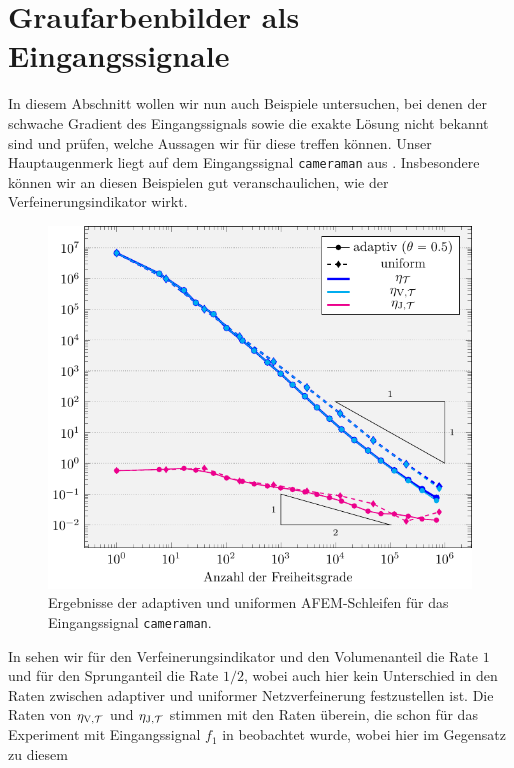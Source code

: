\section{Graufarbenbilder als Eingangssignale}
\label{sec:grayscalePicturesAsInputSignal}

In diesem Abschnitt wollen wir nun auch Beispiele untersuchen, bei denen
der schwache Gradient des Eingangssignals sowie die exakte Lösung nicht bekannt
sind und prüfen, welche Aussagen wir für diese treffen können.
Unser Hauptaugenmerk liegt auf dem Eingangssignal \texttt{cameraman} aus
. 
Insbesondere können wir an diesen Beispielen gut veranschaulichen, wie
der Verfeinerungsindikator wirkt.

\begin{figure}[p]
  \centering
  \includegraphics[width=\linewidth]
    {pictures/chapExperiments/secGrayscale/cam/conv.pdf}
  \caption{Ergebnisse der adaptiven und uniformen AFEM-Schleifen für das 
  Eingangssignal \texttt{cameraman}.}
  \label{fig:camConvergence}
\end{figure}
In  sehen wir für den Verfeinerungsindikator und
den Volumenanteil die Rate $1$ und für den Sprunganteil die Rate $1/2$, wobei
auch hier kein Unterschied in den Raten zwischen adaptiver und uniformer
Netzverfeinerung festzustellen ist.
Die Raten von $\eta_{\textup{V}, \mathcal{T}}$ und $\eta_{\textup{J}, \mathcal{T}}$ stimmen mit den Raten überein, 
die schon für das Experiment mit Eingangssignal $f_1$ in 
 beobachtet wurde, wobei hier im Gegensatz zu diesem
